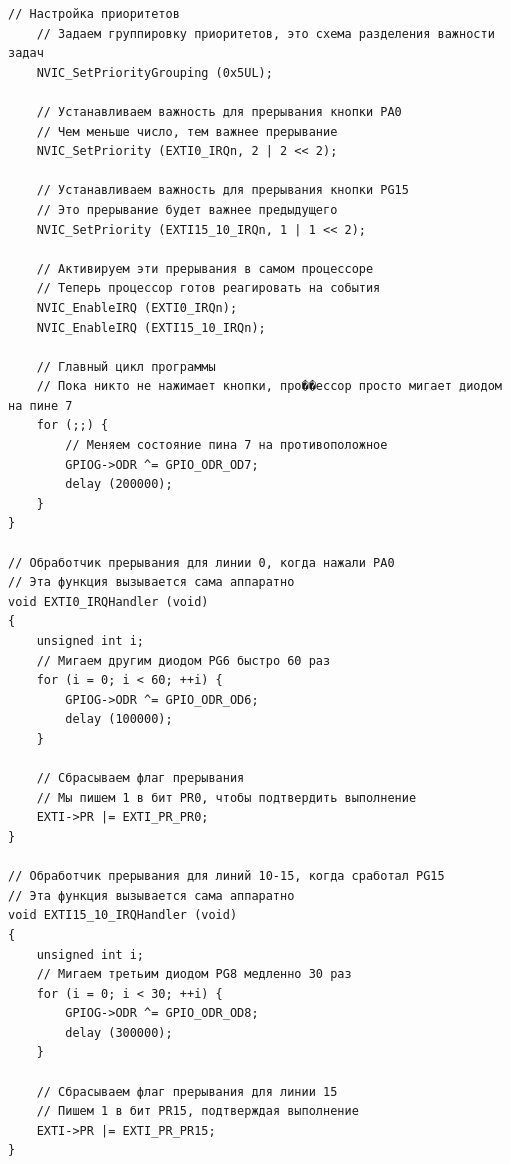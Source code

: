 \begin{lstlisting}[style=cstyle, caption={Основная функция программы}]
    // Настройка приоритетов
    // Задаем группировку приоритетов, это схема разделения важности задач
    NVIC_SetPriorityGrouping (0x5UL); 

    // Устанавливаем важность для прерывания кнопки PA0
    // Чем меньше число, тем важнее прерывание
    NVIC_SetPriority (EXTI0_IRQn, 2 | 2 << 2); 
    
    // Устанавливаем важность для прерывания кнопки PG15
    // Это прерывание будет важнее предыдущего
    NVIC_SetPriority (EXTI15_10_IRQn, 1 | 1 << 2);

    // Активируем эти прерывания в самом процессоре
    // Теперь процессор готов реагировать на события
    NVIC_EnableIRQ (EXTI0_IRQn); 
    NVIC_EnableIRQ (EXTI15_10_IRQn);

    // Главный цикл программы
    // Пока никто не нажимает кнопки, про��ессор просто мигает диодом на пине 7
    for (;;) {
        // Меняем состояние пина 7 на противоположное
        GPIOG->ODR ^= GPIO_ODR_OD7;
        delay (200000); 
    }
}

// Обработчик прерывания для линии 0, когда нажали PA0
// Эта функция вызывается сама аппаратно
void EXTI0_IRQHandler (void)
{
    unsigned int i;
    // Мигаем другим диодом PG6 быстро 60 раз
    for (i = 0; i < 60; ++i) {
        GPIOG->ODR ^= GPIO_ODR_OD6; 
        delay (100000);
    }
    
    // Сбрасываем флаг прерывания
    // Мы пишем 1 в бит PR0, чтобы подтвердить выполнение
    EXTI->PR |= EXTI_PR_PR0; 
}

// Обработчик прерывания для линий 10-15, когда сработал PG15
// Эта функция вызывается сама аппаратно
void EXTI15_10_IRQHandler (void)
{
    unsigned int i;
    // Мигаем третьим диодом PG8 медленно 30 раз
    for (i = 0; i < 30; ++i) {
        GPIOG->ODR ^= GPIO_ODR_OD8; 
        delay (300000);
    }
    
    // Сбрасываем флаг прерывания для линии 15
    // Пишем 1 в бит PR15, подтверждая выполнение
    EXTI->PR |= EXTI_PR_PR15; 
}
\end{lstlisting}

\newpage